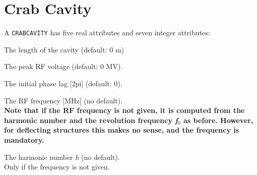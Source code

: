 

\section{Crab Cavity}
\label{sec:crab_cavity}\label{sec:crabcavity}



A {\tt CRABCAVITY} has five real attributes and seven integer attributes: 

\begin{madlist}
   The length of the cavity (default: 0 m) 

   The peak RF voltage (default: 0 MV). 

   The initial phase lag [2pi] (default: 0). 

   The RF frequency [MHz] (no default). \\[3mm]
    {\bf Note that if the RF frequency is not given, it is computed from the
    harmonic number and the revolution frequency \textit{f$_0$} as before. 
    However, for deflecting structures this makes no sense, and the 
    frequency is mandatory.} 

   The harmonic number \textit{h} (no default). \\
  Only if the frequency is not given. 

\end{madlist}

